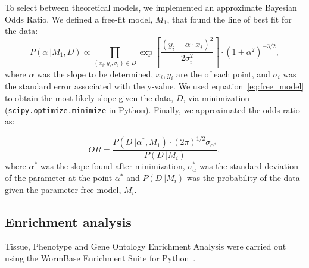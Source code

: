 To select between theoretical models, we implemented an approximate Bayesian
Odds Ratio. We defined a free-fit model, $M_1$, that found the line of best fit
for the data:
\begin{equation}
  P(\alpha~|M_1, D) \propto \prod_{(x_i, y_i, \sigma_i)\in D}
  \exp{
       [\frac{{(y_i - \alpha\cdot x_i)}^2} %
            {2\sigma_i^2}] %
      } \cdot {(1+\alpha^2)}^{-3/2},
  \label{eq:free_model}
\end{equation}
where $\alpha$ was the slope to be determined, $x_i, y_i$ are the
of each point, and $\sigma_i$ was the standard
error associated with the y-value. We used equation~\ref{eq:free_model} to
obtain the most likely slope given the data, $D$, via minimization
(\texttt{scipy.optimize.minimize} in Python). Finally, we approximated the odds
ratio as:

\begin{equation}
  OR = \frac{
  P(D~|\alpha^*, M_1)\cdot {(2\pi)}^{1/2}\sigma_{\alpha^*} %
  }{P(D~| M_i)}, %
\end{equation}
where $\alpha^*$ was the slope found after minimization, $\sigma_\alpha^*$ was the
standard deviation of the parameter at the point $\alpha^*$ and $P(D~|M_i)$ was
the probability of the data given the parameter-free model, $M_i$.

\subsection*{Enrichment analysis}
Tissue, Phenotype and Gene Ontology Enrichment Analysis were carried out using
the WormBase Enrichment Suite for Python~\citep{Angeles-Albores106369,
Angeles-Albores2016}.

